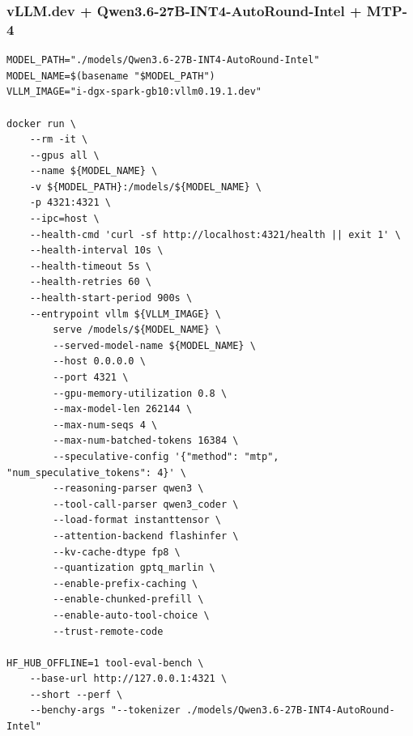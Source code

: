 \documentclass{article}
\begin{document}
\subsubsection{vLLM.dev + Qwen3.6-27B-INT4-AutoRound-Intel + MTP-4}
\begin{lstlisting}
MODEL_PATH="./models/Qwen3.6-27B-INT4-AutoRound-Intel"
MODEL_NAME=$(basename "$MODEL_PATH")
VLLM_IMAGE="i-dgx-spark-gb10:vllm0.19.1.dev"

docker run \
    --rm -it \
    --gpus all \
    --name ${MODEL_NAME} \
    -v ${MODEL_PATH}:/models/${MODEL_NAME} \
    -p 4321:4321 \
    --ipc=host \
    --health-cmd 'curl -sf http://localhost:4321/health || exit 1' \
    --health-interval 10s \
    --health-timeout 5s \
    --health-retries 60 \
    --health-start-period 900s \
    --entrypoint vllm ${VLLM_IMAGE} \
        serve /models/${MODEL_NAME} \
        --served-model-name ${MODEL_NAME} \
        --host 0.0.0.0 \
        --port 4321 \
        --gpu-memory-utilization 0.8 \
        --max-model-len 262144 \
        --max-num-seqs 4 \
        --max-num-batched-tokens 16384 \
        --speculative-config '{"method": "mtp", "num_speculative_tokens": 4}' \
        --reasoning-parser qwen3 \
        --tool-call-parser qwen3_coder \
        --load-format instanttensor \
        --attention-backend flashinfer \
        --kv-cache-dtype fp8 \
        --quantization gptq_marlin \
        --enable-prefix-caching \
        --enable-chunked-prefill \
        --enable-auto-tool-choice \
        --trust-remote-code

HF_HUB_OFFLINE=1 tool-eval-bench \
    --base-url http://127.0.0.1:4321 \
    --short --perf \
    --benchy-args "--tokenizer ./models/Qwen3.6-27B-INT4-AutoRound-Intel"
\end{lstlisting}
\end{document}
